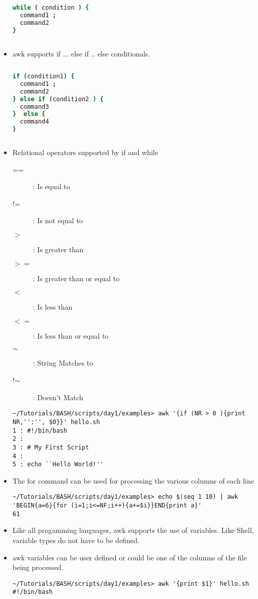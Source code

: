 \documentclass[10pt,t]{beamer}
\begin{document}
\begin{frame}
\begin{itemize}
\begin{columns}
\begin{exampleblock}{}
\begin{lstlisting}[language=bash]
while ( condition ) {
  command1 ;
  command2
}
        \end{lstlisting}
      \end{exampleblock}
    \end{columns}
    \framebreak
    \item awk supports if ... else if .. else conditionals. 
    \begin{columns}
      \begin{exampleblock}{}
        \begin{lstlisting}[language=bash]
if (condition1) {
  command1 ;
  command2
} else if (condition2 ) {
  command3
}  else {
  command4
}
        \end{lstlisting}
      \end{exampleblock}
    \end{columns}
    \item Relational operators supported by if and while
    \begin{description}
        \item[==]: Is equal to
        \item[!=]: Is not equal to
        \item[$>$]: Is greater than
        \item[$>=$]: Is greater than or equal to
        \item[$<$]: Is less than
        \item[$<=$]: Is less than or equal to
        \item[$\sim$]: String Matches to
        \item[!$\sim$]: Doesn't Match
    \end{description}
    \begin{lstlisting}[style=LINUX]
~/Tutorials/BASH/scripts/day1/examples> awk '{if (NR > 0 ){print NR,'':'', $0}}' hello.sh 
1 : #!/bin/bash
2 : 
3 : # My First Script
4 : 
5 : echo ``Hello World!''
    \end{lstlisting}
    \item The for command can be used for processing the various columns of each line
    \begin{lstlisting}[style=LINUX]
~/Tutorials/BASH/scripts/day1/examples> echo $(seq 1 10) | awk 'BEGIN{a=6}{for (i=1;i<=NF;i++){a+=$i}}END{print a}'                                                                                 
61
    \end{lstlisting}
    \item Like all progamming languages, awk supports the use of variables. Like Shell, variable types do not have to be defined.
    \item awk variables can be user defined or could be one of the columns of the file being processed.
    \begin{lstlisting}[style=LINUX]
~/Tutorials/BASH/scripts/day1/examples> awk '{print $1}' hello.sh 
#!/bin/bash


\end{lstlisting}
\end{itemize}
\end{frame}
\end{document}
